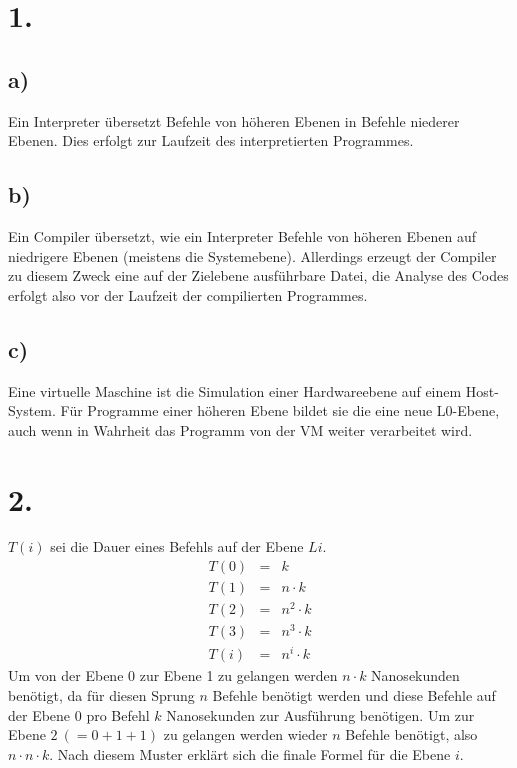 \documentclass[a4paper]{scrartcl}
\title{\titleinfo}
\author{Tronje Krabbe 6435002, The-Vinh Jackie Huynh 6388888,\\Arne Struck 6326505}
\date{\today}
\begin{document}
\maketitle
\notag
\section{1.}
	\subsection{a)}
			Ein Interpreter übersetzt Befehle von höheren Ebenen in Befehle niederer Ebenen. Dies 
			erfolgt zur Laufzeit des interpretierten Programmes. 
	\subsection{b)}
			Ein Compiler übersetzt, wie ein Interpreter Befehle von höheren Ebenen auf niedrigere 
			Ebenen (meistens die Systemebene). Allerdings erzeugt der Compiler zu diesem Zweck eine 
			auf der Zielebene ausführbare Datei, die Analyse des Codes erfolgt also vor der Laufzeit 
			der compilierten Programmes. 
	\subsection{c)}
			Eine virtuelle Maschine ist die Simulation einer Hardwareebene auf einem Host-System.
			Für Programme einer höheren Ebene bildet sie die eine neue L0-Ebene, auch wenn in 
			Wahrheit das Programm von der VM weiter verarbeitet wird. 


\section{2.}
	\(T(i)\) sei die Dauer eines Befehls auf der Ebene \(Li\).
	\[
	\begin{array}{rcl}
		T(0) &=& k \\
		T(1) &=& n\cdot k \\
		T(2) &=& n^2\cdot k \\
		T(3) &=& n^3\cdot k \\
		T(i) &=& n^i\cdot k
	\end{array}
	\]
	Um von der Ebene 0 zur Ebene 1  zu gelangen werden \(n\cdot k\) Nanosekunden benötigt, da 
	für diesen Sprung \(n\) Befehle benötigt werden und diese Befehle auf der Ebene 0 pro Befehl 
	\(k\) Nanosekunden zur Ausführung benötigen.
	Um zur Ebene \(2\ (=0+1+1)\) zu gelangen werden wieder \(n\) Befehle benötigt, also \(n\cdot 
	n\cdot k\). Nach diesem Muster erklärt sich die finale Formel für die Ebene \(i\).
	
\end{document}
